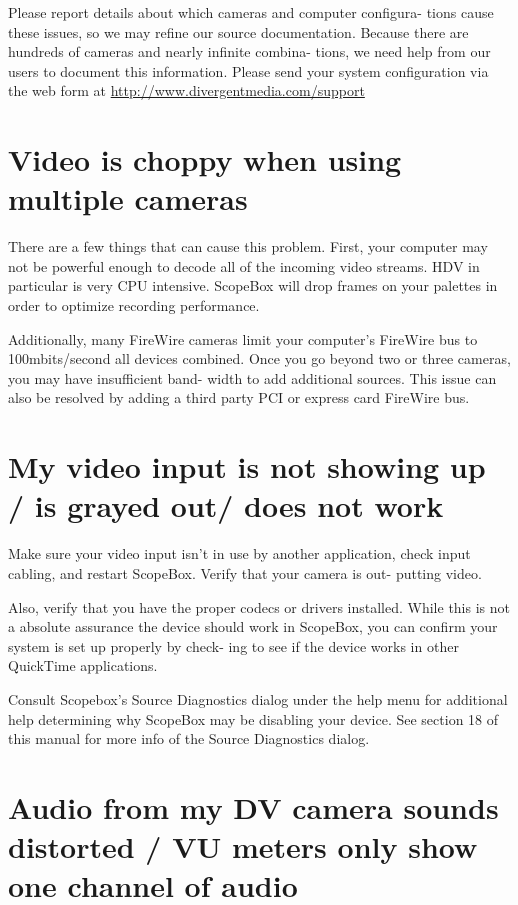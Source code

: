 \documentclass[10,letterpaper,]{report}
\begin{document}
Please report details about which cameras and computer configura- tions
cause these issues, so we may refine our source documentation. Because
there are hundreds of cameras and nearly infinite combina- tions, we
need help from our users to document this information. Please send your
system configuration via the web form at
\url{http://www.divergentmedia.com/support}

\section{Video is choppy when using multiple cameras}

There are a few things that can cause this problem. First, your computer
may not be powerful enough to decode all of the incoming video streams.
HDV in particular is very CPU intensive. ScopeBox will drop frames on
your palettes in order to optimize recording performance.

Additionally, many FireWire cameras limit your computer's FireWire bus
to 100mbits/second all devices combined. Once you go beyond two or three
cameras, you may have insufficient band- width to add additional
sources. This issue can also be resolved by adding a third party PCI or
express card FireWire bus.

\section{My video input is not showing up / is grayed out/ does not
work}

Make sure your video input isn't in use by another application, check
input cabling, and restart ScopeBox. Verify that your camera is out-
putting video.

Also, verify that you have the proper codecs or drivers installed. While
this is not a absolute assurance the device should work in ScopeBox, you
can confirm your system is set up properly by check- ing to see if the
device works in other QuickTime applications.

Consult Scopebox's Source Diagnostics dialog under the help menu for
additional help determining why ScopeBox may be disabling your device.
See section 18 of this manual for more info of the Source Diagnostics
dialog.

\section{Audio from my DV camera sounds distorted / VU meters only show
one channel of audio}
\end{document}
